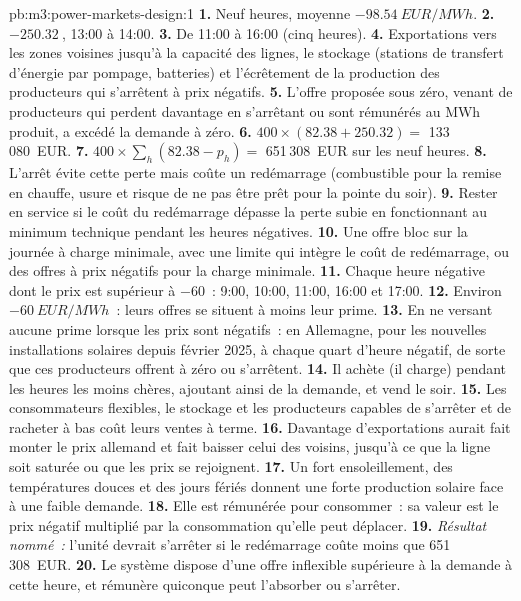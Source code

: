 \begin{solution}{pb:m3:power-markets-design:1}
\textbf{1.} Neuf heures, moyenne $-\qty{98.54}{EUR/MWh}$. \textbf{2.} $-\qty{250.32}{}$, 13:00
à 14:00. \textbf{3.} De 11:00 à 16:00 (cinq heures). \textbf{4.} Exportations vers les zones voisines
jusqu'à la capacité des lignes, le stockage (stations de transfert d'énergie par pompage, batteries) et l'écrêtement de
la production des producteurs qui s'arrêtent à prix négatifs. \textbf{5.} L'offre proposée sous zéro, venant de producteurs qui
perdent davantage en s'arrêtant ou sont rémunérés au MWh produit, a excédé la demande à zéro.
\textbf{6.} $400 \times (82.38 + 250.32) = $ 133\,080~EUR. \textbf{7.} $400 \times \sum_h
(82.38 - p_h) = $ 651\,308~EUR sur les neuf heures. \textbf{8.} L'arrêt évite cette
perte mais coûte un redémarrage (combustible pour la remise en chauffe, usure et risque de ne pas être prêt pour la
pointe du soir). \textbf{9.} Rester en service si le coût du redémarrage dépasse la perte subie en fonctionnant au
minimum technique pendant les heures négatives. \textbf{10.} Une offre bloc sur la journée à charge minimale, avec
une limite qui intègre le coût de redémarrage, ou des offres à prix négatifs pour la charge minimale.
\textbf{11.} Chaque heure négative dont le prix est supérieur à $-60$~: 9:00, 10:00, 11:00, 16:00 et
17:00. \textbf{12.} Environ $-\qty{60}{EUR/MWh}$~: leurs offres se situent à moins leur prime.
\textbf{13.} En ne versant aucune prime lorsque les prix sont négatifs~: en Allemagne, pour les nouvelles installations solaires
depuis février 2025, à chaque quart d'heure négatif, de sorte que ces producteurs offrent à zéro ou
s'arrêtent. \textbf{14.} Il achète (il charge) pendant les heures les moins chères, ajoutant ainsi de la demande, et vend
le soir. \textbf{15.} Les consommateurs flexibles, le stockage et les producteurs capables de s'arrêter et de racheter
à bas coût leurs ventes à terme. \textbf{16.} Davantage d'exportations aurait fait monter le prix allemand
et fait baisser celui des voisins, jusqu'à ce que la ligne soit saturée ou que les prix se rejoignent. \textbf{17.} Un fort ensoleillement,
des températures douces et des jours fériés donnent une forte production solaire face à une faible demande. \textbf{18.} Elle est
rémunérée pour consommer~: sa valeur est le prix négatif multiplié par la consommation qu'elle peut déplacer.
\textbf{19.} \emph{Résultat nommé~:} l'unité devrait s'arrêter si le redémarrage coûte moins que
651\,308~EUR. \textbf{20.} Le système dispose d'une offre inflexible supérieure à la demande à cette
heure, et rémunère quiconque peut l'absorber ou s'arrêter.
\end{solution}

